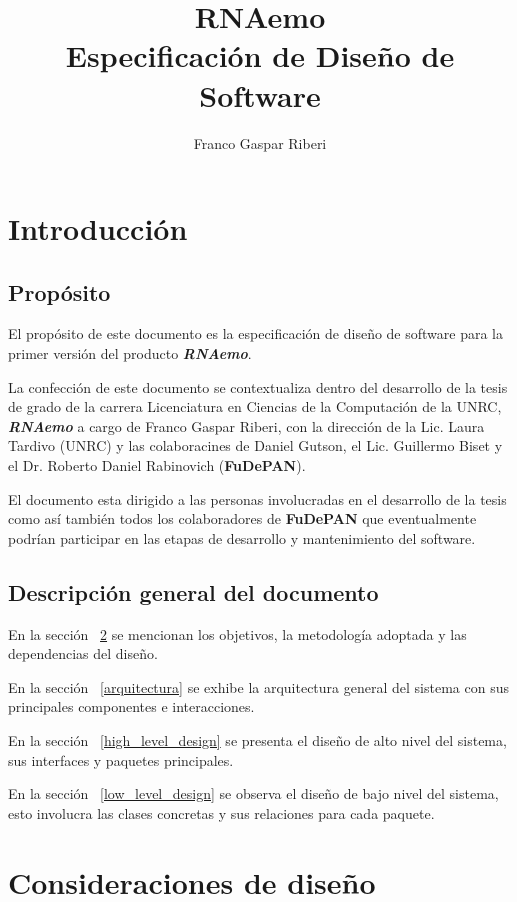 \documentclass[12pt,a4paper,spanish]{article}
\title{\textbf{RNAemo}\\ \vspace{0.45cm} Especificación de Diseño de Software}
\author{Franco Gaspar Riberi}
\begin{document}
\maketitle\pagebreak{}\tableofcontents{}\pagebreak{}

\newpage

\section{Introducción}
\subsection{Propósito}

El propósito de este documento es la especificación de
diseño de software para la primer versión del producto 
\emph{\textbf{RNAemo}}.

La confección de este documento se contextualiza dentro del desarrollo de la tesis
de grado de la carrera Licenciatura en Ciencias de la Computación de la UNRC,
\emph{\textbf{RNAemo}} a cargo de Franco Gaspar Riberi, con la dirección
de la Lic. Laura Tardivo (UNRC) y las colaboracines de Daniel
Gutson, el Lic. Guillermo Biset y el Dr. Roberto Daniel Rabinovich
(\textbf{FuDePAN}).

El documento esta dirigido a las personas involucradas en el desarrollo de la
tesis como así también todos los colaboradores de \textbf{FuDePAN} que eventualmente
podrían participar en las etapas de desarrollo y mantenimiento del software.

\subsection{Descripci\'on general del documento}
En la sección ~\ref{consideraciones} se mencionan los objetivos, la
metodología adoptada y las dependencias del diseño.

En la sección ~\ref{arquitectura} se exhibe la arquitectura general del
sistema con sus principales componentes e interacciones.

En la sección ~\ref{high_level_design} se presenta el diseño de alto nivel del sistema,
sus interfaces y paquetes principales.
				    
En la sección ~\ref{low_level_design} se observa el diseño de bajo nivel del sistema,
esto involucra las clases concretas y sus relaciones para cada paquete.

\section{Consideraciones de diseño}
\label{consideraciones}
\end{document}
